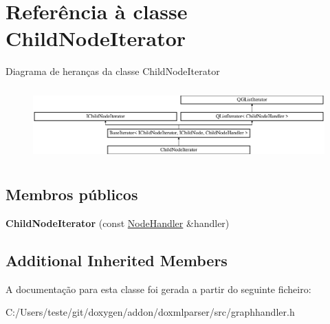\hypertarget{class_child_node_iterator}{\section{Referência à classe Child\-Node\-Iterator}
\label{class_child_node_iterator}
}
Diagrama de heranças da classe Child\-Node\-Iterator\begin{figure}[H]
\begin{center}
\leavevmode
\includegraphics[height=2.814070cm]{class_child_node_iterator}
\end{center}
\end{figure}
\subsection*{Membros públicos}
\begin{DoxyCompactItemize}
\item 
\hypertarget{class_child_node_iterator_a4753b775099344ce3f16be3f5fbec0b7}{{\bfseries Child\-Node\-Iterator} (const \hyperlink{class_node_handler}{Node\-Handler} \&handler)}\label{class_child_node_iterator_a4753b775099344ce3f16be3f5fbec0b7}

\end{DoxyCompactItemize}
\subsection*{Additional Inherited Members}


A documentação para esta classe foi gerada a partir do seguinte ficheiro\-:\begin{DoxyCompactItemize}
\item 
C\-:/\-Users/teste/git/doxygen/addon/doxmlparser/src/graphhandler.\-h\end{DoxyCompactItemize}
